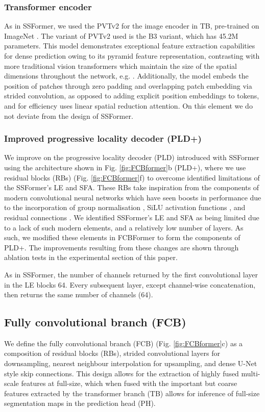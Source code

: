 \documentclass[runningheads]{llncs}
\begin{document}
\subsubsection{Transformer encoder}
As in SSFormer, we used the PVTv2 \cite{pvtv2} for the image encoder in TB, pre-trained on ImageNet \cite{imagenet}. The variant of PVTv2 used is the B3 variant, which has 45.2M parameters. This model demonstrates exceptional feature extraction capabilities for dense prediction owing to its pyramid feature representation, contrasting with more traditional vision transformers which maintain the size of the spatial dimensions throughout the network, e.g. \cite{vit,deit,dpt}. Additionally, the model embeds the position of patches through zero padding and overlapping patch embedding via strided convolution, as opposed to adding explicit position embeddings to tokens, and for efficiency uses linear spatial reduction attention. On this element we do not deviate from the design of SSFormer.

\subsubsection{Improved progressive locality decoder (PLD+)}\label{newPLD}
We improve on the progressive locality decoder (PLD) introduced with SSFormer using the architecture shown in Fig. \ref{fig:FCBformer}b (PLD+), where we use residual blocks (RBs) (Fig. \ref{fig:FCBformer}f) to overcome identified limitations of the SSFormer's LE and SFA. These RBs take inspiration from the components of modern convolutional neural networks which have seen boosts in performance due to the incorporation of group normalisation \cite{groupnorm}, SiLU activation functions \cite{gelu}, and residual connections \cite{resnet}. We identified SSFormer's LE and SFA as being limited due to a lack of such modern elements, and a relatively low number of layers. As such, we modified these elements in FCBFormer to form the components of PLD+. The improvements resulting from these changes are shown through ablation tests in the experimental section of this paper.

As in SSFormer, the number of channels returned by the first convolutional layer in the LE blocks 64. Every subsequent layer, except channel-wise concatenation, then returns the same number of channels (64).

\subsection{Fully convolutional branch (FCB)}
We define the fully convolutional branch (FCB) (Fig. \ref{fig:FCBformer}c) as a composition of residual blocks (RBs), strided convolutional layers for downsampling, nearest neighbour interpolation for upsampling, and dense U-Net style skip connections. This design allows for the extraction of highly fused multi-scale features at full-size, which when fused with the important but coarse features extracted by the transformer branch (TB) allows for inference of full-size segmentation maps in the prediction head (PH).
\end{document}
